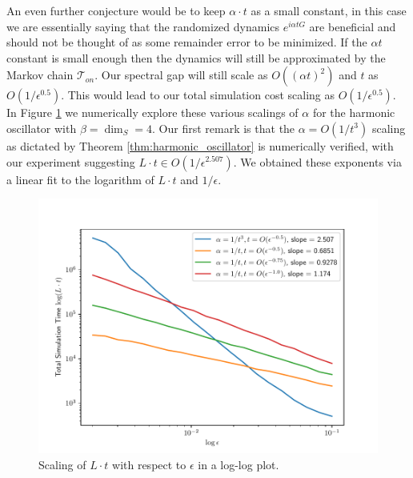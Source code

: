 \documentclass{article}
\newcommand{\norm}[1]{\left|\left| #1 \right|\right|}
\newcommand{\TT}{\mathcal{T}}
\newcommand{\bigo}[1]{O\left(#1\right)}
\newcommand{\identity}{\mathds{1}}
\begin{document}
An even further conjecture would be to keep $\alpha \cdot t$ as a small constant, in this case we are essentially saying that the randomized dynamics $e^{i \alpha t G}$ are beneficial and should not be thought of as some remainder error to be minimized. If the $\alpha t$ constant is small enough then the dynamics will still be approximated by the Markov chain $\TT_{on}$. Our spectral gap will still scale as $\bigo{(\alpha t)^2}$ and $t$ as $\bigo{1/\epsilon^{0.5}}$. This would lead to our total simulation cost scaling as $\bigo{1/\epsilon^{0.5}}$. In Figure \ref{fig:epsilon_scaling} we numerically explore these various scalings of $\alpha$ for the harmonic oscillator with $\beta = \dim_S = 4$. Our first remark is that the $\alpha = \bigo{1/t^3}$ scaling as dictated by Theorem \ref{thm:harmonic_oscillator} is numerically verified, with our experiment suggesting $L \cdot t \in \bigo{1/\epsilon^{2.507}}$. We obtained these exponents via a linear fit to the logarithm of $L\cdot t$ and $1/\epsilon$.



\begin{figure}
    \centering
    \includegraphics[width=0.5\linewidth]{numerics/data/epsilon_fitting_plot_3.pdf}
    \caption{Scaling of $L \cdot t$ with respect to $\epsilon$ in a log-log plot.}
    \label{fig:epsilon_scaling}
\end{figure}


\end{document}

